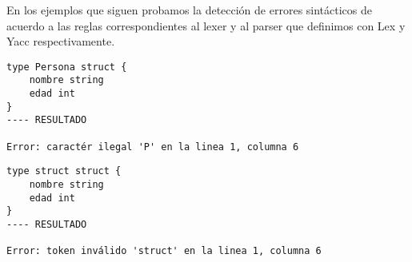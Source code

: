 En los ejemplos que siguen probamos la detección de errores sintácticos de acuerdo a las reglas correspondientes al lexer y al parser que definimos con Lex y Yacc respectivamente.

\begin{lstlisting}[caption=Ejemplo con caracter ilegal no reconocido por el lexer.]
type Persona struct {
    nombre string
    edad int
}
---- RESULTADO

Error: caractér ilegal 'P' en la linea 1, columna 6
\end{lstlisting}

\begin{lstlisting}[caption=Ejemplo donde se usa la palabra reservada \texttt{struct} después de \texttt{type} cuando se esperaba un identificador.]
type struct struct {
    nombre string
    edad int
}
---- RESULTADO

Error: token inválido 'struct' en la linea 1, columna 6
\end{lstlisting}